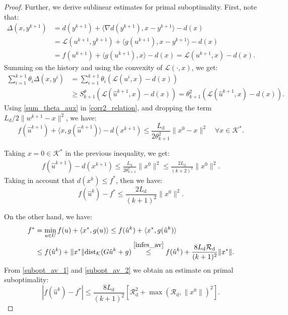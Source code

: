 \documentclass{gOMS2e}
\theoremstyle{plain}
\theoremstyle{definition}
\theoremstyle{remark}
\providecommand{\norm}[1]{\lVert#1\rVert}
\begin{document}
\begin{proof}
\noindent Further, we derive sublinear  estimates
for primal suboptimality. First, note that:
\begin{align*}
\Delta(x,y^{k+1}) &=  d(y^{k+1}) + \langle \nabla d(y^{k+1}),  x-y^{k+1}\rangle -d(x) \\
&=\mathcal{L}(u^{k+1},y^{k+1}) + \langle g(u^{k+1}), x-y^{k+1}\rangle -d(x) \\
&=f(u^{k+1}) + \langle g(u^{k+1}), x\rangle -d(x) =
\mathcal{L}(u^{k+1},x) -d(x).
 \end{align*}
\noindent Summing on the history  and using  the convexity of
$\mathcal{L}(\cdot,x)$, we get:
\begin{align}
\sum\limits_{i=1}^{k+1}\theta_i \Delta(x,y^i)
&= \sum\limits_{i=1}^{k+1}\theta_i(\mathcal{L}(u^{i},x) -d(x))\nonumber\\
&\ge S_{k+1}^{\theta}\left(\mathcal{L}(\hat{u}^{k+1},x) -d(x)\right)
= \theta_{k+1}^2\left(\mathcal{L}(\hat{u}^{k+1},x) -d(x)\right).
\label{sum_theta_aux}
\end{align}
Using \eqref{sum_theta_aux} in \eqref{corr2_relation}, and dropping
the term $L_\text{d}/2\norm{w^{k+1}-x}^2$, we have:
\begin{equation}\label{}
f(\hat{u}^{k+1}) + \langle x, g(\hat{u}^{k+1})\rangle - d(x^{k+1})
\le \frac{L_\text{d}}{2\theta_{k+1}^2}\norm{x^0-x}^2 \quad \forall x
\in {{\mathcal{K}}^*}.
\end{equation}

\noindent Taking  $x=0 \in {{\mathcal{K}}^*}$ in the previous inequality, we get:
\begin{align*}
f(\hat{u}^{k+1}) - d(x^{k+1}) \leq
\frac{L_\text{d}}{2\theta_{k+1}^2}\norm{x^0}^2 \leq
\frac{2L_\text{d}}{(k+2)^2} \norm{x^0}^2.
\end{align*}
Taking in account that $d(x^{k}) \le f^*$, then we have:
\begin{equation}
\label{subopt_av_1} f(\hat{u}^{k}) - f^* \le
\frac{2L_\text{d}}{(k+1)^2} \norm{x^0}^2.
\end{equation}

\noindent On the other hand, we have:
\begin{align}
f^* &=  \min_{u \in U} f(u) + \langle x^*, g(u) \rangle \leq
f(\hat u^k) + \langle x^*, g(\hat u^k)  \rangle \nonumber\\
& \le f(\hat u^k) + \norm{x^*} \text{dist}_{\mathcal{K}} (G \hat u^k+ g)
\overset{\eqref{infes_av}}{\leq} f(\hat u^k) + \frac{8L_\text{d}
\mathcal{R}_{\text{d}}}{(k+1)^2}   \norm{x^*}. \label{subopt_av_2}
\end{align}
From \eqref{subopt_av_1} and \eqref{subopt_av_2} we obtain an
estimate on primal suboptimality:
\begin{equation}
\label{ps_dfg} |f(\hat{u}^{k}) - f^*| \le
\frac{8L_\text{d}}{(k+1)^2}\left[ \mathcal{R}_{\text{d}}^2 +
\max(\mathcal{R}_{\text{d}},\norm{x^0})^2 \right].
\end{equation}


\end{proof}
\end{document}
